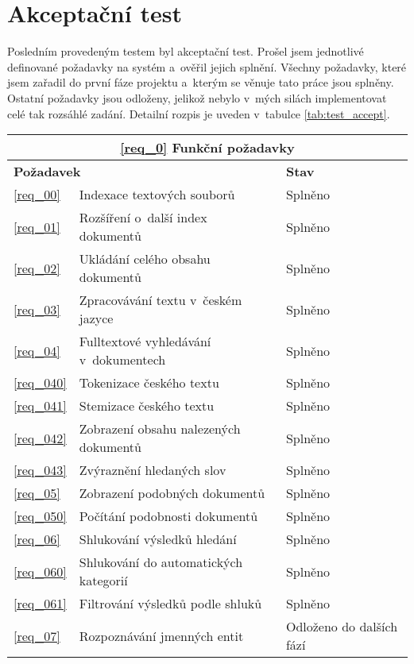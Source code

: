 \section{Akceptační test}
Posledním provedeným testem byl akceptační test. Prošel jsem jednotlivé definované požadavky na systém a~ověřil jejich splnění. Všechny požadavky, které jsem zařadil do první fáze projektu a~kterým se věnuje tato práce jsou splněny. Ostatní požadavky jsou odloženy, jelikož nebylo v~mých silách implementovat celé tak rozsáhlé zadání. Detailní rozpis je uveden v~tabulce \ref{tab:test_accept}.
\begin{table}
\begin{center}
\begin{tabular}{|l|l|p{6cm}|}
\hline
\multicolumn{3}{|c|}{\textbf{\ref{req_0} Funkční požadavky}} \\ \hline
\multicolumn{2}{|l|}{\textbf{Požadavek}} & \textbf{Stav} \\ \hline
\ref{req_00} & Indexace textových souborů & Splněno\\ \hline 
\ref{req_01} & Rozšíření o~další index dokumentů & Splněno\\ \hline 
\ref{req_02} & Ukládání celého obsahu dokumentů & Splněno\\ \hline 
\ref{req_03} & Zpracovávání textu v~českém jazyce & Splněno\\ \hline 
\ref{req_04} & Fulltextové vyhledávání v~dokumentech & Splněno\\ \hline 
\ref{req_040} & Tokenizace českého textu & Splněno\\ \hline 
\ref{req_041} & Stemizace českého textu & Splněno\\ \hline 
\ref{req_042} & Zobrazení obsahu nalezených dokumentů & Splněno\\ \hline 
\ref{req_043} & Zvýraznění hledaných slov & Splněno\\ \hline 
\ref{req_05} & Zobrazení podobných dokumentů & Splněno\\ \hline 
\ref{req_050} & Počítání podobnosti dokumentů & Splněno\\ \hline 
\ref{req_06} & Shlukování výsledků hledání & Splněno\\ \hline 
\ref{req_060} & Shlukování do automatických kategorií & Splněno\\ \hline 
\ref{req_061} & Filtrování výsledků podle shluků & Splněno\\ \hline 
\ref{req_07} & Rozpoznávání jmenných entit & Odloženo do dalších fází\\ \hline 

\end{tabular}
\end{center}
\end{table}
